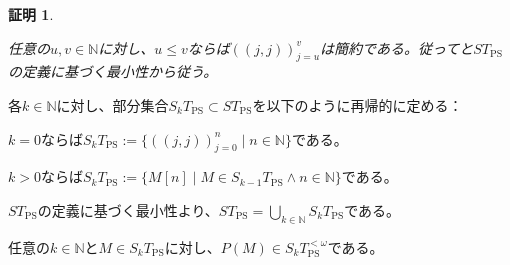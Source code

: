 \documentclass[dvipdfmx,uplatex]{jsarticle}
\theoremstyle{customnonumberbreakfortheorem}
\theoremstyle{customnonumberbreakforproof}
\newtheorem{hideableproof}{証明}
\begin{document}
\begin{hideableproof}
	\begin{indented}
		\item 任意の\(u,v \in \mathbb{N}\)に対し、\(u \leq v\)ならば\(((j,j))_{j=u}^{v}\)は簡約である。従ってと\(ST_{\textrm{PS}}\)の定義に基づく最小性から従う。
	\end{indented}
\end{hideableproof}

各\(k \in \mathbb{N}\)に対し、部分集合\(S_kT_{\textrm{PS}} \subset ST_{\textrm{PS}}\)を以下のように再帰的に定める：
\begin{nenumerate}
	\item \(k = 0\)ならば\(S_kT_{\textrm{PS}} := \{((j,j))_{j=0}^{n} \mid n \in \mathbb{N}\}\)である。
	\item \(k > 0\)ならば\(S_kT_{\textrm{PS}} := \{M[n] \mid M \in S_{k-1}T_{\textrm{PS}} \wedge n \in \mathbb{N}\}\)である。
\end{nenumerate}

\(ST_{\textrm{PS}}\)の定義に基づく最小性より、\(ST_{\textrm{PS}} = \bigcup_{k \in \mathbb{N}} S_kT_{\textrm{PS}}\)である。

\begin{proposition}[標準形の単項成分が標準形であること]\label{標準形の単項成分が標準形であること}
	任意の\(k \in \mathbb{N}\)と\(M \in S_kT_{\textrm{PS}}\)に対し、\(P(M) \in S_kT_{\textrm{PS}}^{< \omega}\)である。
\end{proposition}
\end{document}

